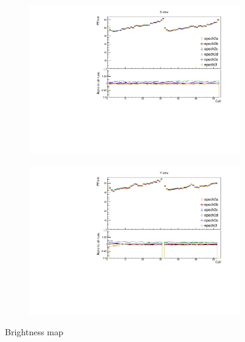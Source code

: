 \documentclass[12pt,a4paper]{article}
\begin{document}
\begin{figure}[hbtp]
\centering
\begin{subfigure}[b]{\textwidth}
\centering
\includegraphics[width=\textwidth]{Plots/Attenprofs_P2Data_CellPE_X_Combined.pdf}
\end{subfigure}
\begin{subfigure}[b]{\textwidth}
\centering
\includegraphics[width=\textwidth]{Plots/Attenprofs_P2Data_CellPE_Y_Combined.pdf}
\end{subfigure}
\caption{Brightness map}
\end{figure}
\end{document}
